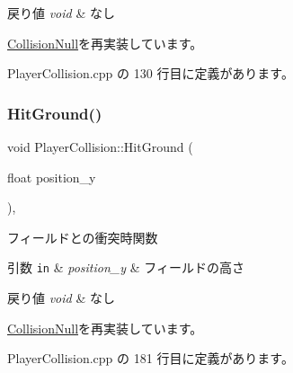 \begin{DoxyRetVals}{戻り値}
{\em void} & なし \\
\hline
\end{DoxyRetVals}


\mbox{\hyperlink{class_collision_null_a2bb1c8ca023aada97055256e033d823e}{Collision\+Null}}を再実装しています。



 Player\+Collision.\+cpp の 130 行目に定義があります。

\mbox{\label{class_player_collision_a3522ce17b1e1752f2737c2243582ecb0}} 
\subsubsection{\texorpdfstring{Hit\+Ground()}{HitGround()}}
{\footnotesize\ttfamily void Player\+Collision\+::\+Hit\+Ground (\begin{DoxyParamCaption}\item[{float}]{position\+\_\+y }\end{DoxyParamCaption})\hspace{0.3cm}{\ttfamily [override]}, {\ttfamily [virtual]}}



フィールドとの衝突時関数 


\begin{DoxyParams}[1]{引数}
\mbox{\tt in}  & {\em position\+\_\+y} & フィールドの高さ \\
\hline
\end{DoxyParams}

\begin{DoxyRetVals}{戻り値}
{\em void} & なし \\
\hline
\end{DoxyRetVals}


\mbox{\hyperlink{class_collision_null_ac5645bca5f03262d1918e2ff8348440d}{Collision\+Null}}を再実装しています。



 Player\+Collision.\+cpp の 181 行目に定義があります。

\mbox{\label{class_player_collision_a5048cc608d72d03d02b23c5533dbfd10}} 
